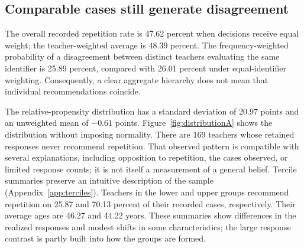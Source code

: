 \subsection{Comparable cases still generate disagreement}
The overall recorded repetition rate is 47.62 percent when decisions receive equal weight; the teacher-weighted average is 48.39 percent. The frequency-weighted probability of a disagreement between distinct teachers evaluating the same identifier is 25.89 percent, compared with 26.01 percent under equal-identifier weighting. Consequently, a clear aggregate hierarchy does not mean that individual recommendations coincide.

The relative-propensity distribution has a standard deviation of 20.97 points and an unweighted mean of $-0.61$ points. Figure~\ref{fig:distributionA} shows the distribution without imposing normality. There are 169 teachers whose retained responses never recommend repetition. That observed pattern is compatible with several explanations, including opposition to repetition, the cases observed, or limited response counts; it is not itself a measurement of a general belief.
Tercile summaries preserve an intuitive description of the sample (Appendix~\ref{app:terciles}). Teachers in the lower and upper groups recommend repetition on 25.87 and 70.13 percent of their recorded cases, respectively. Their average ages are 46.27 and 44.22 years. These summaries show differences in the realized responses and modest shifts in some characteristics; the large response contrast is partly built into how the groups are formed.

